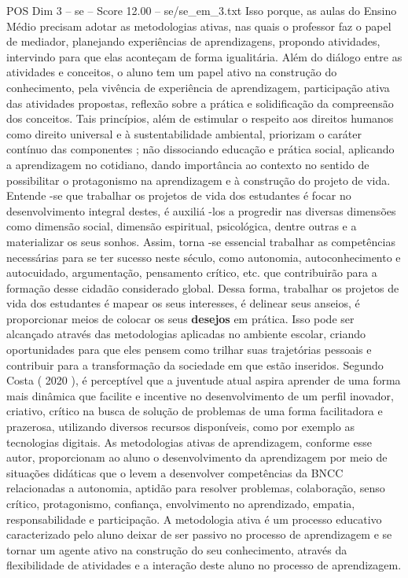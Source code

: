 \begin{textsample}{POS Dim 3 – se – Score 12.00 – se/se\_em\_3.txt}
Isso porque, as aulas do Ensino Médio precisam adotar as metodologias ativas, nas quais o professor faz o papel de mediador, planejando experiências de aprendizagens, propondo atividades, intervindo para que elas aconteçam de forma igualitária.
Além do diálogo entre as atividades e conceitos, o aluno tem um papel ativo na construção do conhecimento, pela vivência de experiência de aprendizagem, participação ativa das atividades propostas, reflexão sobre a prática e solidificação da compreensão dos conceitos.
Tais princípios, além de estimular o respeito aos direitos humanos como direito universal e à sustentabilidade ambiental, priorizam o caráter contínuo das componentes ; não dissociando educação e prática social, aplicando a aprendizagem no cotidiano, dando importância ao contexto no sentido de possibilitar o protagonismo na aprendizagem e à construção do projeto de vida.
Entende -se que trabalhar os projetos de vida dos estudantes é focar no desenvolvimento integral destes, é auxiliá -los a progredir nas diversas dimensões como dimensão social, dimensão espiritual, psicológica, dentre outras e a materializar os seus sonhos.
Assim, torna -se essencial trabalhar as competências necessárias para se ter sucesso neste século, como autonomia, autoconhecimento e autocuidado, argumentação, pensamento crítico, etc. que contribuirão para a formação desse cidadão considerado global.
Dessa forma, trabalhar os projetos de vida dos estudantes é mapear os seus interesses, é delinear seus anseios, é proporcionar meios de colocar os seus \textbf{desejos} em prática.
Isso pode ser alcançado através das metodologias aplicadas no ambiente escolar, criando oportunidades para que eles pensem como trilhar suas trajetórias pessoais e contribuir para a transformação da sociedade em que estão inseridos.
Segundo Costa ( 2020 ), é perceptível que a juventude atual aspira aprender de uma forma mais dinâmica que facilite e incentive no desenvolvimento de um perfil inovador, criativo, crítico na busca de solução de problemas de uma forma facilitadora e prazerosa, utilizando diversos recursos disponíveis, como por exemplo as tecnologias digitais.
As metodologias ativas de aprendizagem, conforme esse autor, proporcionam ao aluno o desenvolvimento da aprendizagem por meio de situações didáticas que o levem a desenvolver competências da BNCC relacionadas a autonomia, aptidão para resolver problemas, colaboração, senso crítico, protagonismo, confiança, envolvimento no aprendizado, empatia, responsabilidade e participação.
A metodologia ativa é um processo educativo caracterizado pelo aluno deixar de ser passivo no processo de aprendizagem e se tornar um agente ativo na construção do seu conhecimento, através da flexibilidade de atividades e a interação deste aluno no processo de aprendizagem.

\end{textsample}

